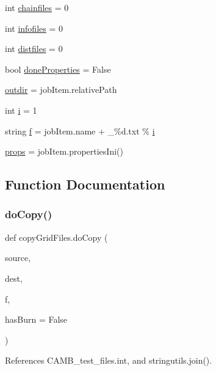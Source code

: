 \begin{DoxyCompactItemize}
int \mbox{\hyperlink{namespacecopyGridFiles_a688c0eb8ecee8ba6bb75bf56aa550073}{chainfiles}} = 0
\item 
int \mbox{\hyperlink{namespacecopyGridFiles_afc9c926a69458cd609f13a048dda3960}{infofiles}} = 0
\item 
int \mbox{\hyperlink{namespacecopyGridFiles_a793dd13fa829e3a9bfde006f4f5b6602}{distfiles}} = 0
\item 
bool \mbox{\hyperlink{namespacecopyGridFiles_a749c2732f5782b6714bb732c2f9f5404}{done\+Properties}} = False
\item 
\mbox{\hyperlink{namespacecopyGridFiles_a404ccf8c4bd46a01ecd3ec35b1954dec}{outdir}} = job\+Item.\+relative\+Path
\item 
int \mbox{\hyperlink{namespacecopyGridFiles_a4f1dfe8eada67b327b4605f22876cdb9}{i}} = 1
\item 
string \mbox{\hyperlink{namespacecopyGridFiles_a90ae0943b4d2a4255fc89daf0ac45e6a}{f}} = job\+Item.\+name + \textquotesingle{}\+\_\+\%d.\+txt\textquotesingle{} \% \mbox{\hyperlink{namespacecopyGridFiles_a4f1dfe8eada67b327b4605f22876cdb9}{i}}
\item 
\mbox{\hyperlink{namespacecopyGridFiles_aacf361e6d263bcbbbe8eb0d93179c78d}{props}} = job\+Item.\+properties\+Ini()
\end{DoxyCompactItemize}


\subsection{Function Documentation}
\mbox{\label{namespacecopyGridFiles_a2a1a9125be3fe46d8b1ae0f62f56c4c8}} 
\subsubsection{\texorpdfstring{do\+Copy()}{doCopy()}}
{\footnotesize\ttfamily def copy\+Grid\+Files.\+do\+Copy (\begin{DoxyParamCaption}\item[{}]{source,  }\item[{}]{dest,  }\item[{}]{f,  }\item[{}]{has\+Burn = {\ttfamily False} }\end{DoxyParamCaption})}



References C\+A\+M\+B\+\_\+test\+\_\+files.\+int, and stringutils.\+join().

